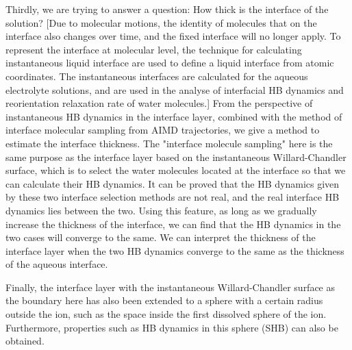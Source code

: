 Thirdly, we are trying to answer a question: How thick is the interface of the solution? 
[Due to molecular motions, the identity of molecules that on the interface also changes over time\cite{Willard2010}, and the fixed interface will no longer apply. 
To represent the interface at molecular level, the technique for calculating instantaneous liquid interface are used to define a liquid interface from atomic coordinates.
The instantaneous interfaces are calculated for the aqueous electrolyte solutions, and are used in the analyse of interfacial HB dynamics
and reorientation relaxation rate of water molecules.]
From the perspective of instantaneous HB dynamics in the interface layer, combined with the method of interface molecular sampling from AIMD trajectories,
we give a method to estimate the interface thickness. The "interface molecule sampling" here is the same purpose as the interface layer 
based on the instantaneous Willard-Chandler surface, which is to select the water molecules located at the interface so that we can calculate their HB dynamics. 
It can be proved that the HB dynamics given by these two interface selection methods are not real, and the real interface HB dynamics lies between the two. 
Using this feature, as long as we gradually increase the thickness of the interface, we can find that the HB dynamics in the two cases will converge to the same. 
We can interpret the thickness of the interface layer when the two HB dynamics converge to the same as the thickness of the aqueous interface.

Finally, the interface layer with the instantaneous Willard-Chandler surface as the boundary here has also been extended to a sphere with a certain radius outside the ion, 
such as the space inside the first dissolved sphere of the ion. Furthermore, properties such as HB dynamics in this sphere (SHB) can also be obtained.


